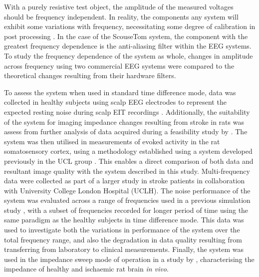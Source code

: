 With a purely resistive test object, the amplitude of the measured voltages should be frequency independent. In reality, the components any system will exhibit some variations with frequency, necessitating some degree of calibration in post processing \cite{Hun_Wi_2014,McEwan_2006}. In the case of the ScouseTom system, the component with the greatest frequency dependence is the anti-aliasing filter within the EEG systems. To study the frequency dependence of the system as whole, changes in amplitude across frequency using two commercial EEG systems were compared to the theoretical changes resulting from their hardware filters. 

To assess the system when used in standard time difference mode, data was collected in healthy subjects using scalp EEG electrodes to represent the expected resting noise during scalp EIT recordings \cite{Fabrizi_2006,fabrizi2007analysis,Romsauerova2006}. Additionally, the suitability of the system for imaging impedance changes resulting from stroke in rats was assess from further analysis of data acquired during a feasibility study by \citet{Dowrick_2016}. The system was then utilised in measurements of evoked activity in the rat somatosensory cortex, using a methodology established using a system developed previously in the UCL group \cite{Oh2011,Aristovich_2016}. This enables a direct comparison of both data and resultant image quality with the system described in this study. Multi-frequency data were collected as part of a larger study in stroke patients in collaboration with University College London Hospital (UCLH). The noise performance of the system was evaluated across a range of frequencies used in a previous simulation study \cite{Malone2014a}, with a subset of frequencies recorded for longer period of time using the same paradigm as the healthy subjects in time difference mode. This data was used to investigate both the variations in performance of the system over the total frequency range, and also the degradation in data quality resulting from transferring from laboratory to clinical measurements. Finally, the system was used in the impedance sweep mode of operation in a study by \citet{Dowrick_2015}, characterising the impedance of healthy and ischaemic rat brain \emph{in vivo}. 

